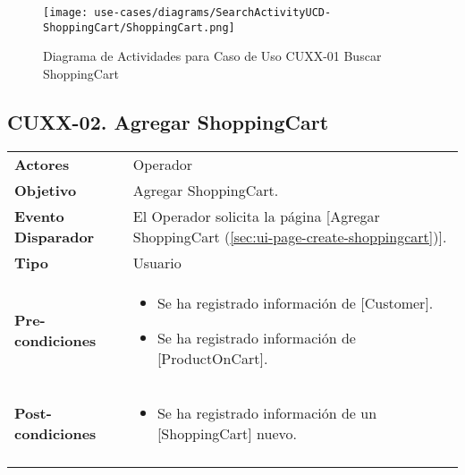 	\begin{figure}[H]
		\begin{center}
			\label{tab:activity-search-ucd-entity-shoppingcart}
			\texttt{[image: use-cases/diagrams/SearchActivityUCD-ShoppingCart/ShoppingCart.png]}
			\caption{Diagrama de Actividades para Caso de Uso CUXX-01 Buscar ShoppingCart}
	\end{center}
	\end{figure}
	\clearpage
	\subsection{CUXX-02. Agregar ShoppingCart} \label{sec:cu-create-ShoppingCart}
	
	\begin{tabular}{ p{3.5cm} p{11.5cm} }
		\textbf{Actores} & Operador\\
		\textbf{Objetivo} & Agregar ShoppingCart.\\
		\textbf{Evento Disparador} & El Operador solicita la p\'agina [Agregar ShoppingCart (\ref{sec:ui-page-create-shoppingcart})].\\
		\textbf{Tipo} & Usuario\\
		\textbf{Pre-condiciones} &
			\begin{minipage}[t]{0.6\textwidth}
			\begin{itemize}[noitemsep,nolistsep]
			\setlength{\itemindent}{-.5cm}
				\item Se ha registrado informaci\'on de [Customer].
				\item Se ha registrado informaci\'on de [ProductOnCart].
			\end{itemize}
			\end{minipage} \\
		\textbf{Post-condiciones} &
			\begin{minipage}[t]{0.6\textwidth}
			\begin{itemize}[noitemsep,nolistsep]
			\setlength{\itemindent}{-.5cm}
				\item Se ha registrado informaci\'on de un [ShoppingCart] nuevo.
			\end{itemize}
			\end{minipage} \\
		\\
	\end{tabular}
	
